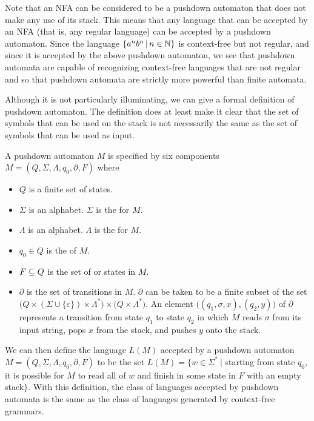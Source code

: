 \medbreak

Note that an NFA can be considered to be a pushdown automaton that
does not make any use of its stack.  This means that any language
that can be accepted by an NFA (that is, any regular language) can
be accepted by a pushdown automaton.
Since the language $\{a^nb^n\,|\, n\in{\mathbb N}\}$ is context-free but not regular,
and since it is accepted by the above pushdown automaton,
we see that pushdown automata are capable of recognizing context-free languages
that are not regular and so that pushdown automata are strictly more
powerful than finite automata.

\bigbreak

Although it is not particularly illuminating, we can give a formal
definition of pushdown automaton.  The definition does at least
make it clear that the set of symbols that can be used on the
stack is not necessarily the same as the set of symbols that can
be used as input.

\begin{definition}
A pushdown automaton $M$ is specified by six components
$M=(Q,\Sigma,\Lambda,q_0,\partial,F)$ where
\begin{itemize}
\item $Q$ is a finite set of states.
\item $\Sigma$ is an alphabet.  $\Sigma$ is the  for $M$.
\item $\Lambda$ is an alphabet.  $\Lambda$ is the  for $M$.
\item $q_0\in Q$ is the  of $M$.
\item $F\subseteq Q$ is the set of  or  states in $M$.
\item $\partial$ is the set of transitions in $M$.  $\partial$ can be taken
to be a finite subset of the set 
$(Q\times(\Sigma\cup\{\varepsilon\})\times\Lambda^*\big)\times\big(Q\times\Lambda^*\big)$.
An element $\big((q_1,\sigma,x),(q_2,y)\big)$ of $\partial$ represents a transition from
state $q_1$ to state $q_2$ in which $M$ reads $\sigma$ from its input string,
pops $x$ from the stack, and pushes $y$ onto the stack.
\end{itemize}
\end{definition}

We can then define the language $L(M)$ accepted by a pushdown
automaton $M=(Q,\Sigma,\Lambda,q_0,\partial,F)$ to be the set
$L(M)=\{w\in\Sigma^*\ |$ starting from state $q_0$, it is possible for $M$ to
read all of $w$ and finish in some state in $F$ with an empty stack$\}$.
With this definition, the class of languages accepted by pushdown automata
is the same as the class of languages generated by context-free grammars.

